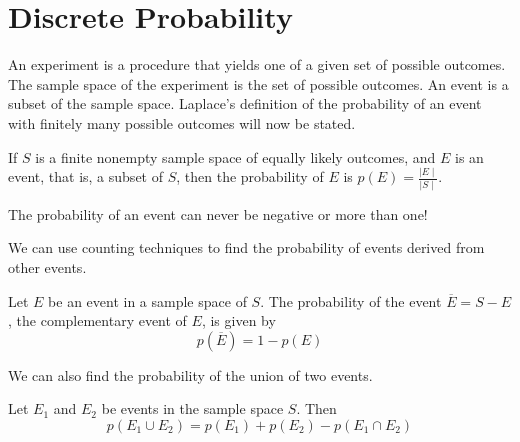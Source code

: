 \documentclass[../discrete.tex]{subfiles}
\begin{document}
\chapter{Discrete Probability}
An experiment is a procedure that yields one of a given set of possible outcomes. 
The sample space of the experiment is the set of possible outcomes. An event is a subset of the sample space.
Laplace's definition of the probability of an event with finitely many possible outcomes will now be stated.

\begin{definition}
    If $S$ is a finite nonempty sample space of equally likely outcomes, and $E$ is an event, 
    that is, a subset of $S$, then the probability of $E$ is $p(E)=\frac{\mid E \mid}{\mid S \mid}$.
\end{definition}
The probability of an event can never be negative or more than one!

We can use counting techniques to find the probability of events derived from other events.
\begin{theorem}
    Let $E$ be an event in a sample space of $S$. The probability of the event $\overline{E}=S-E$, the complementary event of $E$, is given by 
    \[p(\overline{E})=1-p(E)\]
\end{theorem}

We can also find the probability of the union of two events.
\begin{theorem}
    Let $E_1$ and $E_2$ be events in the sample space $S$. Then 
    \[p(E_1\cup E_2)=p(E_1)+p(E_2)-p(E_1\cap E_2)\]
\end{theorem}
\end{document}
